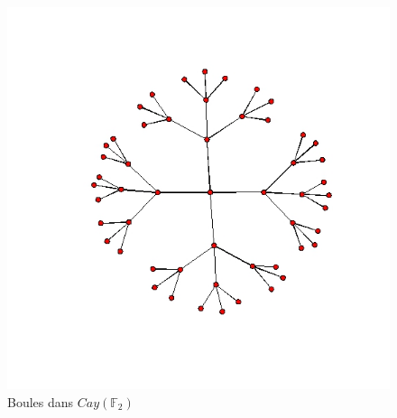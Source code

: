 \documentclass{beamer}
\begin{document}
\begin{frame}
\begin{figure}[h]\centering
\includegraphics[scale=0.35]{CayleyFree2.jpeg}
\caption{Boules dans $Cay(\mathbb F_2)$}
\label{fig:Cayley}
\end{figure}
\end{frame}
\end{document}
